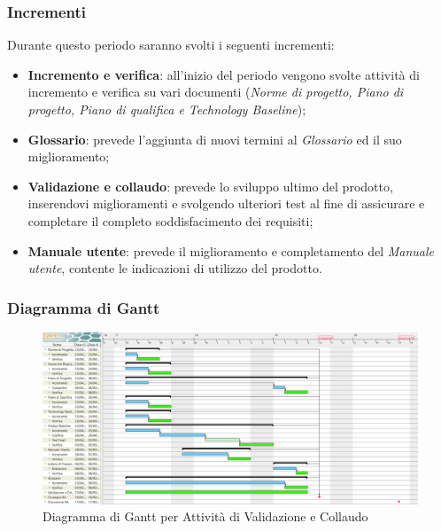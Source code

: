 \subsubsection{Incrementi}
Durante questo periodo saranno svolti i seguenti incrementi:
\begin{itemize}
	\item \textbf{Incremento e verifica}: all'inizio del periodo vengono svolte attività di incremento e verifica su vari documenti (\textit{Norme di progetto, Piano di progetto, Piano di qualifica e Technology Baseline});
	\item \textbf{Glossario}: prevede l'aggiunta di nuovi termini al \textit{Glossario} ed il suo miglioramento;
	\item \textbf{Validazione e collaudo}: prevede lo sviluppo ultimo del prodotto, inserendovi miglioramenti e svolgendo ulteriori test al fine di assicurare e completare il completo soddisfacimento dei requisiti;
	\item \textbf{Manuale utente}: prevede il miglioramento e completamento del \textit{Manuale utente}, contente le indicazioni di utilizzo del prodotto.
\end{itemize}

\begin{landscape}
\subsubsection{Diagramma di Gantt}
\begin{figure}[h]
	\centering
  		\includegraphics[width=1.0\linewidth]{./images/ValidazioneeCollaudo.png}
  		\caption{Diagramma di Gantt per Attività di Validazione e Collaudo}
  		\label{fig:Gantt Validazione e Collaudo}
\end{figure}
\end{landscape}